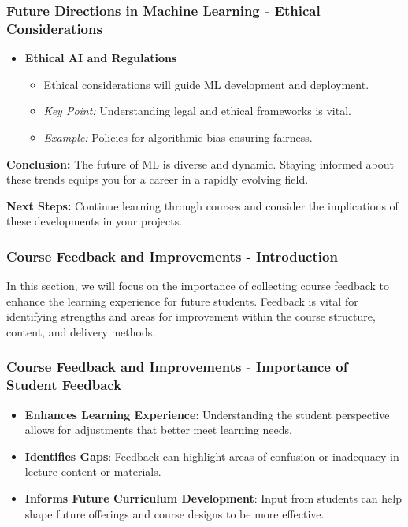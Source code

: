 \documentclass[aspectratio=169]{beamer}
\begin{document}
\begin{frame}[fragile]
    \frametitle{Future Directions in Machine Learning - Ethical Considerations}
    \begin{itemize}
        \item \textbf{Ethical AI and Regulations}
            \begin{itemize}
                \item Ethical considerations will guide ML development and deployment.
                \item \textit{Key Point:} Understanding legal and ethical frameworks is vital.
                \item \textit{Example:} Policies for algorithmic bias ensuring fairness.
            \end{itemize}
    \end{itemize}
    
    \textbf{Conclusion:} 
    The future of ML is diverse and dynamic. Staying informed about these trends equips you for a career in a rapidly evolving field.
    
    \textbf{Next Steps:} 
    Continue learning through courses and consider the implications of these developments in your projects.
\end{frame}

\begin{frame}[fragile]
    \frametitle{Course Feedback and Improvements - Introduction}
    In this section, we will focus on the importance of collecting course feedback to enhance the learning experience for future students. Feedback is vital for identifying strengths and areas for improvement within the course structure, content, and delivery methods.
\end{frame}

\begin{frame}[fragile]
    \frametitle{Course Feedback and Improvements - Importance of Student Feedback}
    \begin{itemize}
        \item \textbf{Enhances Learning Experience}: Understanding the student perspective allows for adjustments that better meet learning needs.
        \item \textbf{Identifies Gaps}: Feedback can highlight areas of confusion or inadequacy in lecture content or materials.
        \item \textbf{Informs Future Curriculum Development}: Input from students can help shape future offerings and course designs to be more effective.
    \end{itemize}
\end{frame}
\end{document}
